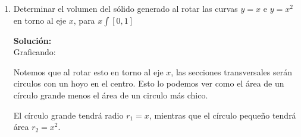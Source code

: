 \documentclass[12pt]{article}
\newenvironment{solucion}
{\begin{mdframed}[backgroundcolor=black!10]
		{\bf Solución:}\\
	}
	{
	\end{mdframed}
}
\newenvironment{preguntas}
{\begin{enumerate}\itemsep12pt
	}
	{
	\end{enumerate}
}
\newcommand{\ev}{\Big|}
\begin{document}
\begin{preguntas}
\begin{solucion}
		Como integraremos en el eje $x$, necesitamos el cateto del triángulo en función de $y$. Es decir, despejando en la ecuación del círculo,
		$$y = \sqrt[]{a^2-x^2}$$
		Como este es el catéto y nuestro triángulo es rectángulo isóceles, sabemos que su área será
		$$A =  \dfrac{(\sqrt[]{a^2-x^2})^2}{2} = \dfrac{a^2-x^2}{2}$$
		Luego,
		$$dV = \dfrac{a^2-x^2}{2} dx$$
		Finalmente, el volumen es
		$$V = 4 \displaystyle \int_0^a \dfrac{a^2-x^2}{2} dx = 4\left(\dfrac{a^2x}{2} - \dfrac{x^3}{6}\right) \ev_0^a = 4\left(\dfrac{a^3}{2} - \dfrac{a^3}{6}\right) = 4\left(\dfrac{2a^3}{6}\right) = \dfrac{4}{3}a^3$$
\end{solucion}
\item Determinar el volumen del sólido generado al rotar las curvas $y=x$ e $y= x^2$ en torno al eje $x$, para $x \int [0,1]$
\begin{solucion}
Graficando:
		\begin{center}
		\end{center}
		
		Notemos que al rotar esto en torno al eje $x$, las secciones transversales serán circulos con un hoyo en el centro. Esto lo podemos ver como el área de un círculo grande menos el área de un circulo más chico.
		
		El círculo grande tendrá radio $r_1 = x$, mientras que el círculo pequeño tendrá área $r_2 = x^2$. 
		

\end{solucion}
\end{preguntas}
\end{document}
